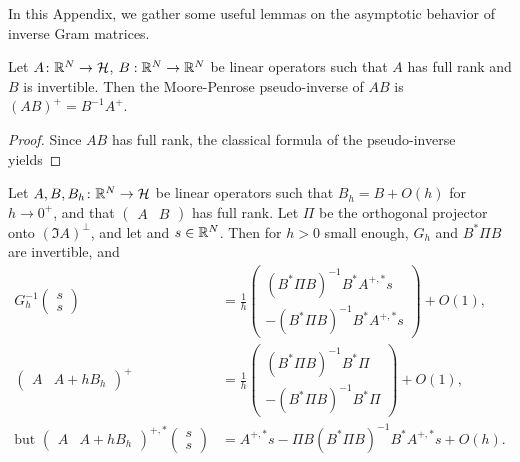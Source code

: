 In this Appendix, we gather some useful lemmas on the asymptotic behavior of inverse Gram matrices.

\begin{lem}
  Let $A\colon \mathbb{R}^N\rightarrow\mathcal{H}$, $B:\mathbb{R}^N\rightarrow\mathbb{R}^N$ be linear operators such that $A$ has full rank and $B$ is invertible. Then the Moore-Penrose pseudo-inverse of $AB$ is $(AB)^+=B^{-1}A^+$.
  \label{lem-apx-inverse}
\end{lem}
\begin{proof}
Since $AB$ has full rank, the classical formula of the pseudo-inverse yields 
\end{proof}

\begin{lem}\label{lem-apx-asymptolasso}
  Let $A,B,B_h\colon \mathbb{R}^N\rightarrow \mathcal{H}$ be linear operators such that $B_h=B +O(h)$ for $h\to 0^+$, and that $\begin{pmatrix}
    A & B
  \end{pmatrix}$ has full rank. Let $\Pi$ be the orthogonal projector onto $(\Im A)^\perp$, and let 
  and $s\in\mathbb{R}^N$. Then for $h>0$ small enough, $G_h$ and $B^*\Pi B$ are invertible, and
  \begin{align}
G_h^{-1}\begin{pmatrix}
    s\\s
  \end{pmatrix}&=\frac{1}{h} \begin{pmatrix} (B^*\Pi B)^{-1}B^*A^{+,*}s\\-(B^*\Pi B)^{-1}B^*A^{+,*}s \end{pmatrix}+O(1),\\
  \begin{pmatrix}
    A& A+hB_h
  \end{pmatrix}^+&= \frac{1}{h}\begin{pmatrix}
  (B^*\Pi B)^{-1}B^*\Pi \\ -(B^*\Pi B)^{-1}B^*\Pi
\end{pmatrix}+O(1),\\
\mbox{but }\begin{pmatrix}
    A& A+hB_h
  \end{pmatrix}^{+,*}\begin{pmatrix}
    s\\s
  \end{pmatrix}
&= A^{+,*}s -\Pi B(B^*\Pi B)^{-1}B^*A^{+,*}s + O(h).
\end{align}
\end{lem}

